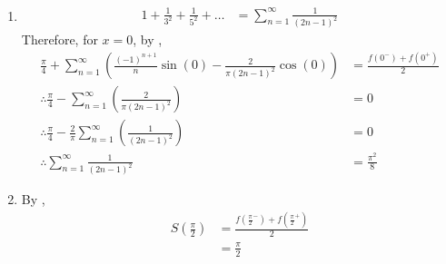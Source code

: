 \documentclass[fleqn, a4paper, 12pt, twoside]{article}
\theoremstyle{definition}
\theoremstyle{theorem}
\begin{document}
\begin{solution}
	\begin{enumerate}[leftmargin=*]
		\item
			\begin{align*}
				1 + \frac{1}{3^2} + \frac{1}{5^2} + \dots & = \sum\limits_{n = 1}^{\infty} \frac{1}{(2 n - 1)^2}
			\end{align*}
			Therefore, for $x = 0$, by ,
			\begin{align*}
				\frac{\pi}{4} + \sum\limits_{n = 1}^{\infty} \left( \frac{(-1)^{n + 1}}{n} \sin(0) - \frac{2}{\pi (2 n - 1)^2} \cos(0) \right) & = \frac{f(0^-) + f(0^+)}{2} \\
				\therefore \frac{\pi}{4} - \sum\limits_{n = 1}^{\infty} \left( \frac{2}{\pi (2 n - 1)^2} \right)                               & = 0                         \\
				\therefore \frac{\pi}{4} - \frac{2}{\pi} \sum\limits_{n = 1}^{\infty} \left( \frac{1}{(2 n - 1)^2} \right)                     & = 0                         \\
				\therefore \sum\limits_{n = 1}^{\infty} \frac{1}{(2 n - 1)^2}                                                                  & = \frac{\pi^2}{8}
			\end{align*}
		\item
			By ,
			\begin{align*}
				S\left( \frac{\pi}{2} \right) & = \frac{f\left( {\frac{\pi}{2}}^- \right) + f\left( {\frac{\pi}{2}}^+ \right)}{2} \\
                                                              & = \frac{\pi}{2}
			\end{align*}
	\end{enumerate}
\end{solution}
\end{document}

